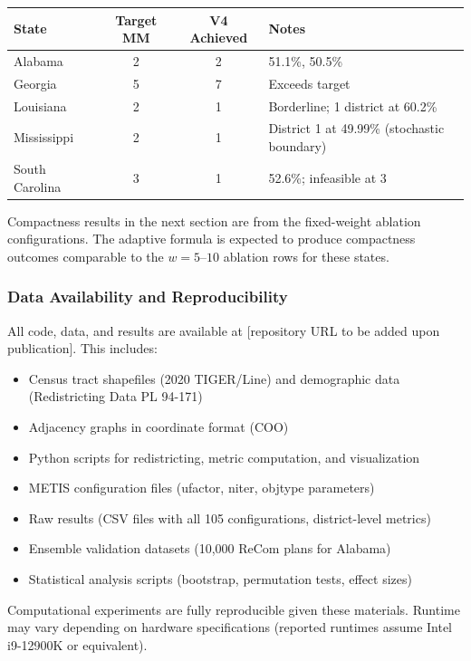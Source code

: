 \begin{center}
\begin{tabular}{lccl}
\toprule
State & Target MM & V4 Achieved & Notes \\
\midrule
Alabama & 2 & 2 & 51.1\%, 50.5\% \\
Georgia & 5 & 7 & Exceeds target \\
Louisiana & 2 & 1 & Borderline; 1 district at 60.2\% \\
Mississippi & 2 & 1 & District 1 at 49.99\% (stochastic boundary) \\
South Carolina & 3 & 1 & 52.6\%; infeasible at 3 \\
\bottomrule
\end{tabular}
\end{center}

Compactness results in the next section are from the fixed-weight ablation configurations. The adaptive formula is expected to produce compactness outcomes comparable to the $w=5$--$10$ ablation rows for these states.

\subsubsection{Data Availability and Reproducibility}

All code, data, and results are available at [repository URL to be added upon publication]. This includes:
\begin{itemize}
    \item Census tract shapefiles (2020 TIGER/Line) and demographic data (Redistricting Data PL 94-171)
    \item Adjacency graphs in coordinate format (COO)
    \item Python scripts for redistricting, metric computation, and visualization
    \item METIS configuration files (ufactor, niter, objtype parameters)
    \item Raw results (CSV files with all 105 configurations, district-level metrics)
    \item Ensemble validation datasets (10,000 ReCom plans for Alabama)
    \item Statistical analysis scripts (bootstrap, permutation tests, effect sizes)
\end{itemize}

Computational experiments are fully reproducible given these materials. Runtime may vary depending on hardware specifications (reported runtimes assume Intel i9-12900K or equivalent).

